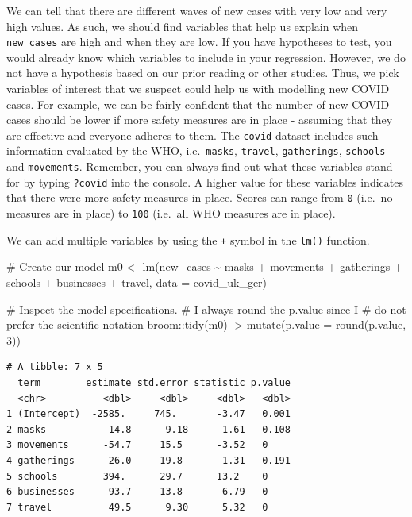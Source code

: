 \documentclass[
  letterpaper,
  DIV=11,
  numbers=noendperiod]{scrreprt}
\newenvironment{Shaded}{\begin{snugshade}}{\end{snugshade}}
\newcommand{\AttributeTok}[1]{\textcolor[rgb]{0.40,0.45,0.13}{#1}}
\newcommand{\CommentTok}[1]{\textcolor[rgb]{0.37,0.37,0.37}{#1}}
\newcommand{\DecValTok}[1]{\textcolor[rgb]{0.68,0.00,0.00}{#1}}
\newcommand{\FunctionTok}[1]{\textcolor[rgb]{0.28,0.35,0.67}{#1}}
\newcommand{\NormalTok}[1]{\textcolor[rgb]{0.00,0.23,0.31}{#1}}
\newcommand{\OtherTok}[1]{\textcolor[rgb]{0.00,0.23,0.31}{#1}}
\newcommand{\SpecialCharTok}[1]{\textcolor[rgb]{0.37,0.37,0.37}{#1}}
\begin{document}
We can tell that there are different waves of new cases with very low
and very high values. As such, we should find variables that help us
explain when \texttt{new\_cases} are high and when they are low. If you
have hypotheses to test, you would already know which variables to
include in your regression. However, we do not have a hypothesis based
on our prior reading or other studies. Thus, we pick variables of
interest that we suspect could help us with modelling new COVID cases.
For example, we can be fairly confident that the number of new COVID
cases should be lower if more safety measures are in place - assuming
that they are effective and everyone adheres to them. The \texttt{covid}
dataset includes such information evaluated by the
\href{https://covid19.who.int/info/}{WHO}, i.e.~\texttt{masks},
\texttt{travel}, \texttt{gatherings}, \texttt{schools} and
\texttt{movements}. Remember, you can always find out what these
variables stand for by typing \texttt{?covid} into the console. A higher
value for these variables indicates that there were more safety measures
in place. Scores can range from \texttt{0} (i.e.~no measures are in
place) to \texttt{100} (i.e.~all WHO measures are in place).

We can add multiple variables by using the \texttt{+} symbol in the
\texttt{lm()} function.

\begin{Shaded}
\begin{Highlighting}[]
\CommentTok{\# Create our model}
\NormalTok{m0 }\OtherTok{\textless{}{-}} \FunctionTok{lm}\NormalTok{(new\_cases }\SpecialCharTok{\textasciitilde{}}\NormalTok{ masks }\SpecialCharTok{+}\NormalTok{ movements }\SpecialCharTok{+}\NormalTok{ gatherings }\SpecialCharTok{+}
\NormalTok{           schools }\SpecialCharTok{+}\NormalTok{ businesses }\SpecialCharTok{+}\NormalTok{ travel,}
         \AttributeTok{data =}\NormalTok{ covid\_uk\_ger)}

\CommentTok{\# Inspect the model specifications.}
\CommentTok{\# I always round the p.value since I}
\CommentTok{\# do not prefer the scientific notation}
\NormalTok{broom}\SpecialCharTok{::}\FunctionTok{tidy}\NormalTok{(m0) }\SpecialCharTok{|\textgreater{}}
  \FunctionTok{mutate}\NormalTok{(}\AttributeTok{p.value =} \FunctionTok{round}\NormalTok{(p.value, }\DecValTok{3}\NormalTok{))}
\end{Highlighting}
\end{Shaded}

\begin{verbatim}
# A tibble: 7 x 5
  term        estimate std.error statistic p.value
  <chr>          <dbl>     <dbl>     <dbl>   <dbl>
1 (Intercept)  -2585.     745.       -3.47   0.001
2 masks          -14.8      9.18     -1.61   0.108
3 movements      -54.7     15.5      -3.52   0    
4 gatherings     -26.0     19.8      -1.31   0.191
5 schools        394.      29.7      13.2    0    
6 businesses      93.7     13.8       6.79   0    
7 travel          49.5      9.30      5.32   0    
\end{verbatim}
\end{document}
